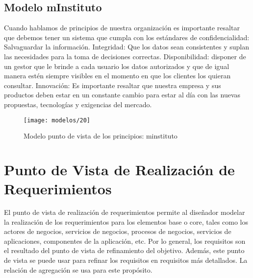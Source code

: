    \subsection{Modelo mInstituto}
   Cuando hablamos de principios de nuestra organización es importante resaltar que debemos tener un sistema que cumpla con los estándares de confidencialidad: Salvaguardar la información. Integridad: Que los datos sean consistentes y suplan las necesidades para la toma de decisiones correctas. Disponibilidad: disponer de un gestor que le brinde a cada usuario los datos autorizados y que de igual manera estén siempre visibles en el momento en que los clientes los quieran consultar. Innovación: Es importante resaltar que nuestra empresa y sus productos deben estar en un constante cambio para estar al día con las nuevas propuestas, tecnologías y exigencias del mercado.
   
   \begin{figure}[H]
   	\centering
   	\texttt{[image: modelos/20]}
   	\captionsetup{width=.95\textwidth}
   	\caption{Modelo punto de vista de los principios: minstituto}
   	\label{modelo20}
   \end{figure}
   
\section{Punto de Vista de Realización de Requerimientos}
El punto de vista de realización de requerimientos permite al diseñador modelar la realización de los requerimientos para los elementos base o core, tales como los actores de negocios, servicios de negocios, procesos de negocios, servicios de aplicaciones, componentes de la aplicación, etc. Por lo general, los requisitos son el resultado del punto de vista de refinamiento del objetivo. Además, este punto de vista se puede usar para refinar los requisitos en requisitos más detallados. La relación de agregación se usa para este propósito. \cite{ref9}
   
